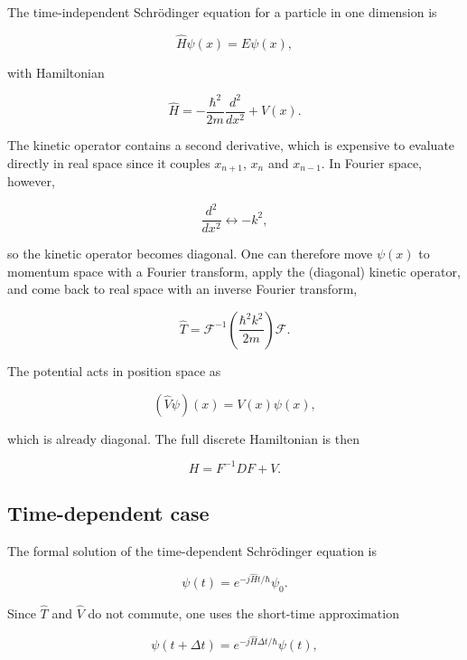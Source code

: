 \documentclass[11pt,a4paper,twoside,pdf]{article}
\numberwithin{equation}{section}
\begin{document}
The time-independent Schr\"odinger equation for a particle in one dimension is

\begin{equation}
\hat H \psi(x) = E \psi(x),
\end{equation}

with Hamiltonian

\begin{equation}
\hat H =
-\frac{\hbar^2}{2m}\frac{d^2}{dx^2}
+ V(x).
\end{equation}

The kinetic operator contains a second derivative, which is expensive to evaluate directly in real space since it couples $x_{n+1}$, $x_{n}$ and $x_{n-1}$. In Fourier space, however,

\begin{equation}
\frac{d^2}{dx^2} \longleftrightarrow -k^2,
\end{equation}

so the kinetic operator becomes diagonal. One can therefore move $\psi(x)$ to momentum space with a Fourier transform, apply the (diagonal) kinetic operator, and come back to real space with an inverse Fourier transform,

\begin{equation}
\hat T
=
\mathcal F^{-1}
\left(
\frac{\hbar^2 k^2}{2m}
\right)
\mathcal F.
\end{equation}


The potential acts in position space as

\begin{equation}
(\hat V\psi)(x)=V(x)\psi(x),
\end{equation}

which is already diagonal. The full discrete Hamiltonian is then

\begin{equation}
H = F^{-1} D F + V.
\end{equation}


\subsection{Time-dependent case}


The formal solution of the time-dependent Schr\"odinger equation is

$$
    \psi(t) = e^{-j\hat{H}t/\hbar} \psi_0.
$$


Since $\hat{T}$ and $\hat{V}$ do not commute, one uses the short-time approximation

$$
    \psi(t + \Delta t) = e^{-j\hat{H}\Delta t/\hbar} \psi(t),
$$
\end{document}
